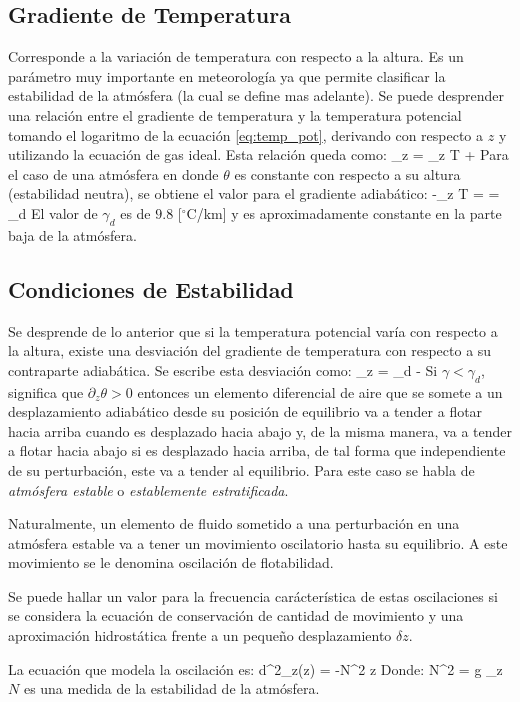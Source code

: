 \subsection{Gradiente de Temperatura}
Corresponde a la variación de temperatura con respecto a la altura. Es un parámetro muy importante en meteorología ya que permite clasificar la estabilidad de la atmósfera (la cual se define mas adelante). Se puede desprender una relación entre el gradiente de temperatura y la temperatura potencial tomando el logaritmo de la ecuación \ref{eq:temp_pot}, derivando con respecto a $z$ y utilizando la ecuación de gas ideal. Esta relación queda como:
\be 
{}\partial_z \theta = \partial_z T +
\ee
Para el caso de una atmósfera en donde $\theta$ es constante con respecto a su altura (estabilidad neutra), se obtiene el valor para el gradiente adiabático:
\be 
-\partial_z T = = \gamma_d
\ee
El valor de $\gamma_d$ es de $9.8$ [$^\circ$C/km] y es aproximadamente constante en la parte baja de la atmósfera.
\subsection{Condiciones de Estabilidad}
Se desprende de lo anterior que si la temperatura potencial varía con respecto a la altura, existe una desviación del gradiente de temperatura con respecto a su contraparte adiabática. Se escribe esta desviación como:
\be 
{}\partial_z \theta = \gamma_d - \gamma
\ee
Si $\gamma<\gamma_d$, significa que $\partial_z \theta>0$ entonces un elemento diferencial de aire que se somete a un desplazamiento adiabático desde su posición de equilibrio va a tender a flotar hacia arriba cuando es desplazado hacia abajo y, de la misma manera, va a tender a flotar hacia abajo si es desplazado hacia arriba, de tal forma que independiente de su perturbación, este va a tender al equilibrio. Para este caso se habla de \emph{atmósfera estable} o \emph{establemente estratificada}.

Naturalmente, un elemento de fluido sometido a una perturbación en una atmósfera estable va a tener un movimiento oscilatorio hasta su equilibrio. A este movimiento se le denomina oscilación de flotabilidad. 

Se puede hallar un valor para la frecuencia carácterística de estas oscilaciones si se considera la ecuación de conservación de cantidad de movimiento y una aproximación hidrostática frente a un pequeño desplazamiento $\delta z$.

La ecuación que modela la oscilación es:
\be \label{eq:flotacion}
d^2_z(\delta z) = -N^2 \delta z
\ee 
Donde:
\be 
N^2 = g \partial_z \ln \theta
\ee
$N$ es una medida de la estabilidad de la atmósfera.

